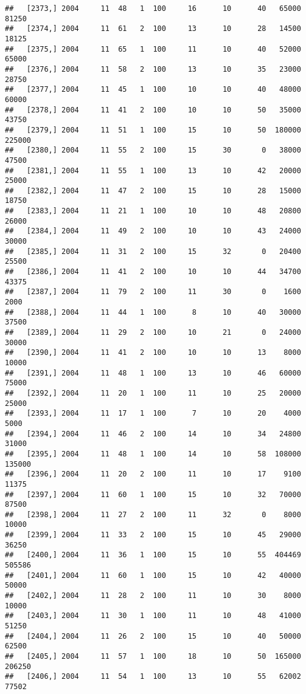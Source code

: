 \documentclass{article}\usepackage[]{graphicx}\usepackage[]{color}
\makeatletter
\newenvironment{kframe}{%
 \def\at@end@of@kframe{}%
 \ifinner\ifhmode%
  \def\at@end@of@kframe{\end{minipage}}%
  \begin{minipage}{\columnwidth}%
 \fi\fi%
 \def\FrameCommand##1{\hskip\@totalleftmargin \hskip-\fboxsep
 \colorbox{shadecolor}{##1}\hskip-\fboxsep
     \hskip-\linewidth \hskip-\@totalleftmargin \hskip\columnwidth}%
 \MakeFramed {\advance\hsize-\width
   \@totalleftmargin\z@ \linewidth\hsize
   \@setminipage}}%
 {\par\unskip\endMakeFramed%
 \at@end@of@kframe}
\newenvironment{knitrout}{}{} %
\makeatother
\begin{document}
\begin{knitrout}
\begin{kframe}
\begin{verbatim}
##   [2373,] 2004     11  48   1  100     16      10      40   65000   81250
##   [2374,] 2004     11  61   2  100     13      10      28   14500   18125
##   [2375,] 2004     11  65   1  100     11      10      40   52000   65000
##   [2376,] 2004     11  58   2  100     13      10      35   23000   28750
##   [2377,] 2004     11  45   1  100     10      10      40   48000   60000
##   [2378,] 2004     11  41   2  100     10      10      50   35000   43750
##   [2379,] 2004     11  51   1  100     15      10      50  180000  225000
##   [2380,] 2004     11  55   2  100     15      30       0   38000   47500
##   [2381,] 2004     11  55   1  100     13      10      42   20000   25000
##   [2382,] 2004     11  47   2  100     15      10      28   15000   18750
##   [2383,] 2004     11  21   1  100     10      10      48   20800   26000
##   [2384,] 2004     11  49   2  100     10      10      43   24000   30000
##   [2385,] 2004     11  31   2  100     15      32       0   20400   25500
##   [2386,] 2004     11  41   2  100     10      10      44   34700   43375
##   [2387,] 2004     11  79   2  100     11      30       0    1600    2000
##   [2388,] 2004     11  44   1  100      8      10      40   30000   37500
##   [2389,] 2004     11  29   2  100     10      21       0   24000   30000
##   [2390,] 2004     11  41   2  100     10      10      13    8000   10000
##   [2391,] 2004     11  48   1  100     13      10      46   60000   75000
##   [2392,] 2004     11  20   1  100     11      10      25   20000   25000
##   [2393,] 2004     11  17   1  100      7      10      20    4000    5000
##   [2394,] 2004     11  46   2  100     14      10      34   24800   31000
##   [2395,] 2004     11  48   1  100     14      10      58  108000  135000
##   [2396,] 2004     11  20   2  100     11      10      17    9100   11375
##   [2397,] 2004     11  60   1  100     15      10      32   70000   87500
##   [2398,] 2004     11  27   2  100     11      32       0    8000   10000
##   [2399,] 2004     11  33   2  100     15      10      45   29000   36250
##   [2400,] 2004     11  36   1  100     15      10      55  404469  505586
##   [2401,] 2004     11  60   1  100     15      10      42   40000   50000
##   [2402,] 2004     11  28   2  100     11      10      30    8000   10000
##   [2403,] 2004     11  30   1  100     11      10      48   41000   51250
##   [2404,] 2004     11  26   2  100     15      10      40   50000   62500
##   [2405,] 2004     11  57   1  100     18      10      50  165000  206250
##   [2406,] 2004     11  54   1  100     13      10      55   62002   77502

\end{verbatim}
\end{kframe}
\end{knitrout}
\end{document}

